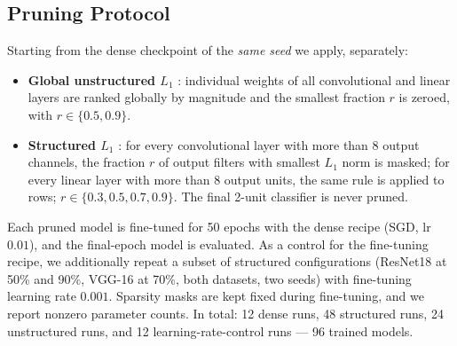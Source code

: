 \documentclass[conference]{IEEEtran}
\newif\ifreview
\newcommand{\REV}[1]{\ifreview\textcolor{red}{\textbf{[Revise: #1]}}\fi}
\begin{document}
\subsection{Pruning Protocol}
Starting from the dense checkpoint of the \emph{same seed} we apply,
separately:
\begin{itemize}
\item \textbf{Global unstructured $L_1$} \cite{han2015learning}:
individual weights of all convolutional and linear layers are ranked
globally by magnitude and the smallest fraction $r$ is zeroed, with
$r \in \{0.5, 0.9\}$.
\item \textbf{Structured $L_1$} \cite{li2017pruning}: for every
convolutional layer with more than 8 output channels, the fraction $r$
of output filters with smallest $L_1$ norm is masked; for every linear
layer with more than 8 output units, the same rule is applied to rows;
$r \in \{0.3, 0.5, 0.7, 0.9\}$. The final 2-unit classifier is never
pruned.
\end{itemize}
Each pruned model is fine-tuned for 50 epochs with the dense recipe
(SGD, lr $0.01$), and the final-epoch model is evaluated. As a control
for the fine-tuning recipe, we additionally repeat a subset of
structured configurations (ResNet18 at 50\% and 90\%, VGG-16 at 70\%,
both datasets, two seeds) with fine-tuning learning rate $0.001$.
Sparsity masks are kept fixed during fine-tuning, and we report nonzero
parameter counts. In total: 12 dense runs, 48 structured runs, 24
unstructured runs, and 12 learning-rate-control runs --- 96 trained
models.
\REV{[A11 -- IMPORTANT] Technical clarifications needed:
(a) Pruning is \emph{layer-wise uniform} (same ratio per layer), while
unstructured is \emph{global}: the two families therefore differ in
allocation as well as granularity; state this and discuss.
(b) Only output filters are masked, so the ``nonzero parameters'' for
structured 50\% (5.59M) equal those of unstructured 50\% -- but a
physically pruned network would be much smaller (input channels of
the next layer also vanish, $\approx$25\% of params at $r{=}0.5$).
Plotting both families on the same ``nonzero parameters'' axis is
therefore not an equal-compression comparison; add \emph{effective}
parameters/FLOPs after physical channel removal (B6) and say which
axis Fig.~\ref{fig:curves} uses.
(c) How are BatchNorm parameters of masked filters handled? If only
conv weights are zeroed, BN $\beta$ still injects a constant, so the
channel is not truly removed.
(d) Are the 1$\times$1 downsample convs in ResNet18 pruned? Your
Discussion says the identity shortcuts are never pruned; clarify for
projection shortcuts.
(e) The learning-rate control (lr 0.001, 50 epochs, no momentum) is
\emph{under-trained} by construction and has only 2 seeds (std of two
values is not meaningful). See B4 for a stronger control.}
\end{document}
